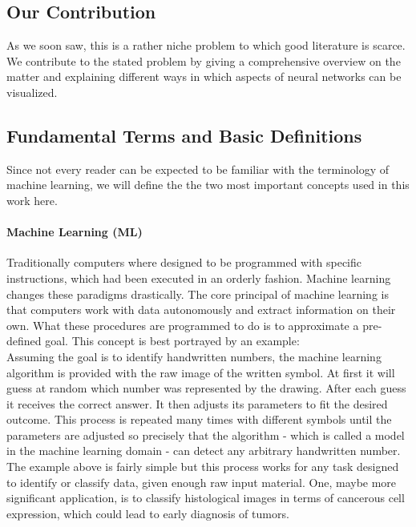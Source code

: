 \documentclass{acmsiggraph}               %
\begin{document}
\subsection{Our Contribution}
As we soon saw, this is a rather niche problem to which good literature is scarce. We contribute to the stated problem by giving a comprehensive overview on the matter and explaining different ways in which aspects of neural networks can be visualized.

\subsection{Fundamental Terms and Basic Definitions}
Since not every reader can be expected to be familiar with the terminology of machine learning, we will define the the two most important concepts used in this work here.

\paragraph{Machine Learning (ML)}
Traditionally computers where designed to be programmed with specific instructions, which had been executed in an orderly fashion.
Machine learning changes these paradigms drastically. The core principal of machine learning is that computers work with data autonomously and extract information on their own. What these procedures are programmed to do is to approximate a pre-defined goal. This concept is best portrayed by an example:\\
Assuming the goal is to identify handwritten numbers, the machine learning algorithm is provided with the raw image of the written symbol. At first it will guess at random which number was represented by the drawing. 
After each guess it receives the correct answer. It then adjusts its parameters to fit the desired outcome.
This process is repeated many times with different symbols until the parameters are adjusted so precisely that the algorithm - which is called a model in the machine learning domain - can detect any arbitrary handwritten number.\\
The example above is fairly simple but this process works for any task designed to identify or classify data, given enough raw input material. One, maybe more significant application, is to classify histological images in terms of cancerous cell expression, which could lead to early diagnosis of tumors.
\end{document}
